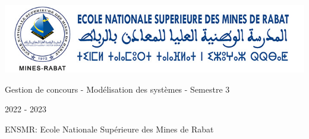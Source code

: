 


\newpage
\thispagestyle{empty}
~
\vfill
\begin{center}
\includegraphics[width=1\textwidth]{img/logo-ensmr-2.jpg}

\large Gestion de concours - Modélisation des systèmes - Semestre 3


\large 2022 - 2023

\large ENSMR: Ecole Nationale Supérieure des Mines de Rabat
\end{center}
